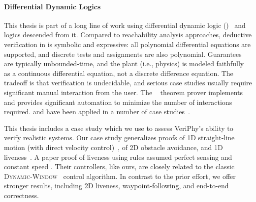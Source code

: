 \documentclass[12pt]{cmuthesis}
\theoremstyle{definition}
\theoremstyle{remark}
\newcommand{\VeriPhy}{VeriPhy\xspace}
\begin{document}
\paragraph{Differential Dynamic Logics}
This thesis is part of a long line of work using differential dynamic logic (\dL)~\cite{DBLP:journals/jar/Platzer08,DBLP:conf/lics/Platzer12a,DBLP:journals/jar/Platzer17} and logics descended from it.
Compared to reachability analysis approaches, deductive verification in \dL is symbolic and expressive: all polynomial differential equations are supported, and discrete tests and assignments are also polynomial.
Guarantees are typically unbounded-time, and the plant (i.e., physics) is modeled faithfully as a continuous differential equation, not a discrete difference equation.
The tradeoff is that verification is undecidable, and serious case studies usually require significant manual interaction from the user.
The \KeYmaeraX~\cite{DBLP:conf/cade/FultonMQVP15} theorem prover implements \dGL and provides significant automation to minimize the number of interactions required.
\dL and \KeYmaeraX have been applied in a number of case studies~\cite{DBLP:conf/cade/Platzer16}.

This thesis includes a case study which we use to assess \VeriPhy's ability to verify realistic systems.
Our case study generalizes \dL proofs of 1D straight-line motion (with direct velocity control)~\cite{DBLP:conf/pldi/BohrerTMMP18}, of 2D obstacle avoidance, and 1D liveness~\cite{DBLP:conf/rss/MitschGP13,DBLP:journals/ijrr/MitschGVP17}.
A paper proof of liveness using \dL rules assumed perfect sensing and constant speed \cite{DBLP:journals/corr/abs-1709-02561}.
Their controllers, like ours, are closely related to the classic \textsc{Dynamic-Window}~\cite{DBLP:journals/ram/FoxBT97} control algorithm.
In contrast to the prior \dL effort, we offer stronger results, including 2D liveness, waypoint-following, and end-to-end correctness.

\end{document}
